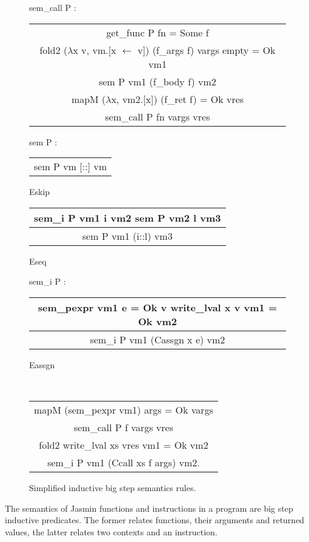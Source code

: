 \documentclass{article}
\begin{document}
\begin{figure}[t]
\ttfamily
sem\_call P :
\begin{center}
\begin{tabular}{c}
get\_func P fn = Some f \\
fold2 (\(\lambda\)x v, vm.[x \(\leftarrow\) v]) (f\_args f) vargs empty = Ok vm1 \\
sem P vm1 (f\_body f) vm2 \\
mapM (\(\lambda\)x, vm2.[x]) (f\_ret f) = Ok vres
\\\hline
sem\_call P fn vargs vres
\end{tabular}
\end{center}

sem P :
\begin{center}
\begin{tabular}{c}
\\\hline
sem P vm [::] vm
\end{tabular} Eskip\quad
\begin{tabular}{c}
sem\_i P vm1 i vm2\quad
sem P vm2 l vm3
\\\hline
sem P vm1 (i::l) vm3
\end{tabular} Eseq
\end{center}

sem\_i P :
\begin{center}
\begin{tabular}{c}
sem\_pexpr vm1 e = Ok v\quad
write\_lval x v vm1 = Ok vm2
\\\hline
sem\_i P vm1 (Cassgn x e) vm2
\end{tabular} Eassgn

~

\begin{tabular}{c}
mapM (sem\_pexpr vm1) args = Ok vargs \\
sem\_call P f vargs vres \\
fold2 write\_lval xs vres vm1 = Ok vm2
\\\hline
sem\_i P vm1 (Ccall xs f args) vm2.
\end{tabular} \raisebox{-\baselineskip}{Ecall}
\end{center}
\normalfont%
\caption{Simplified inductive big step semantics rules.}
\end{figure}

The semantics of Jasmin functions and instructions in a program are big step
inductive predicates. The former relates functions, their arguments and returned
values, the latter relates two contexts and an instruction.
\end{document}
